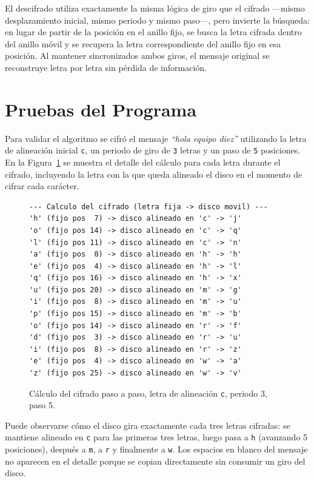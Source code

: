\documentclass[letterpaper,12pt]{article}
\begin{document}
El descifrado utiliza exactamente la misma lógica de giro que el cifrado —mismo
desplazamiento inicial, mismo periodo y mismo paso—, pero invierte la búsqueda: en lugar de
partir de la posición en el anillo fijo, se busca la letra cifrada dentro del anillo móvil
y se recupera la letra correspondiente del anillo fijo en esa posición. Al mantener
sincronizados ambos giros, el mensaje original se reconstruye letra por letra sin pérdida
de información.

\section{Pruebas del Programa}

Para validar el algoritmo se cifró el mensaje \textit{``hola equipo diez''} utilizando la
letra de alineación inicial \texttt{c}, un periodo de giro de \texttt{3} letras y un paso de
\texttt{5} posiciones. En la Figura~\ref{fig:cifrado} se muestra el detalle del cálculo para
cada letra durante el cifrado, incluyendo la letra con la que queda alineado el disco en el
momento de cifrar cada carácter.

\begin{figure}[H]
\centering
\begin{lstlisting}[style=consolestyle]
--- Calculo del cifrado (letra fija -> disco movil) ---
'h' (fijo pos  7) -> disco alineado en 'c' -> 'j'
'o' (fijo pos 14) -> disco alineado en 'c' -> 'q'
'l' (fijo pos 11) -> disco alineado en 'c' -> 'n'
'a' (fijo pos  0) -> disco alineado en 'h' -> 'h'
'e' (fijo pos  4) -> disco alineado en 'h' -> 'l'
'q' (fijo pos 16) -> disco alineado en 'h' -> 'x'
'u' (fijo pos 20) -> disco alineado en 'm' -> 'g'
'i' (fijo pos  8) -> disco alineado en 'm' -> 'u'
'p' (fijo pos 15) -> disco alineado en 'm' -> 'b'
'o' (fijo pos 14) -> disco alineado en 'r' -> 'f'
'd' (fijo pos  3) -> disco alineado en 'r' -> 'u'
'i' (fijo pos  8) -> disco alineado en 'r' -> 'z'
'e' (fijo pos  4) -> disco alineado en 'w' -> 'a'
'z' (fijo pos 25) -> disco alineado en 'w' -> 'v'
\end{lstlisting}
\caption{Cálculo del cifrado paso a paso, letra de alineación \texttt{c}, periodo 3, paso 5.}
\label{fig:cifrado}
\end{figure}

Puede observarse cómo el disco gira exactamente cada tres letras cifradas: se mantiene
alineado en \texttt{c} para las primeras tres letras, luego pasa a \texttt{h} (avanzando 5
posiciones), después a \texttt{m}, a \texttt{r} y finalmente a \texttt{w}. Los espacios en
blanco del mensaje no aparecen en el detalle porque se copian directamente sin consumir un
giro del disco.
\end{document}
